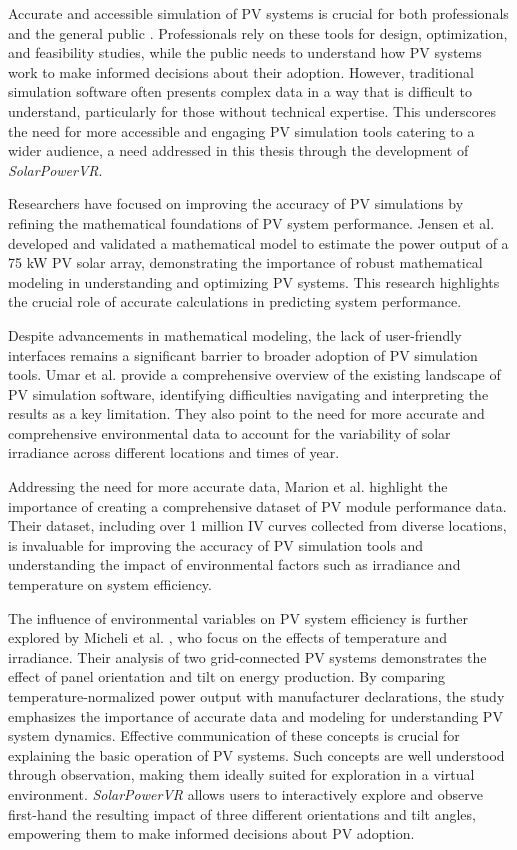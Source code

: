 \documentclass[draft, final]{vutinfth} %
\begin{document}
Accurate and accessible simulation of PV systems is crucial for both professionals and the general public \cite{Milosavljevic2022SimTools}. Professionals rely on these tools for design, optimization, and feasibility studies, while the public needs to understand how PV systems work to make informed decisions about their adoption. However, traditional simulation software often presents complex data in a way that is difficult to understand, particularly for those without technical expertise. This underscores the need for more accessible and engaging PV simulation tools catering to a wider audience, a need addressed in this thesis through the development of \textit{SolarPowerVR}.

Researchers have focused on improving the accuracy of PV simulations by refining the mathematical foundations of PV system performance. Jensen et al. \cite{Jensen2010Model} developed and validated a mathematical model to estimate the power output of a 75 kW PV solar array, demonstrating the importance of robust mathematical modeling in understanding and optimizing PV systems. This research highlights the crucial role of accurate calculations in predicting system performance.

Despite advancements in mathematical modeling, the lack of user-friendly interfaces remains a significant barrier to broader adoption of PV simulation tools. Umar et al. \cite{Umar2018PvSimSoftware} provide a comprehensive overview of the existing landscape of PV simulation software, identifying difficulties navigating and interpreting the results as a key limitation. They also point to the need for more accurate and comprehensive environmental data to account for the variability of solar irradiance across different locations and times of year.

Addressing the need for more accurate data, Marion et al. \cite{Marion2014PvData} highlight the importance of creating a comprehensive dataset of PV module performance data. Their dataset, including over 1 million IV curves collected from diverse locations, is invaluable for improving the accuracy of PV simulation tools and understanding the impact of environmental factors such as irradiance and temperature on system efficiency. 

The influence of environmental variables on PV system efficiency is further explored by Micheli et al. \cite{Micheli2014OutdoorPerformance}, who focus on the effects of temperature and irradiance. Their analysis of two grid-connected PV systems demonstrates the effect of panel orientation and tilt on energy production. By comparing temperature-normalized power output with manufacturer declarations, the study emphasizes the importance of accurate data and modeling for understanding PV system dynamics. Effective communication of these concepts is crucial for explaining the basic operation of PV systems. Such concepts are well understood through observation, making them ideally suited for exploration in a virtual environment. \textit{SolarPowerVR} allows users to interactively explore and observe first-hand the resulting impact of three different orientations and tilt angles, empowering them to make informed decisions about PV adoption.
\end{document}
